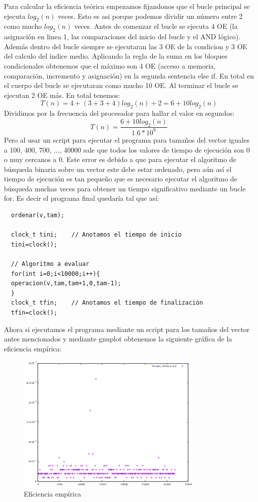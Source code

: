 \documentclass{article}
\begin{document}
Para calcular la eficiencia teórica empezamos fijandonos que el bucle principal se ejecuta $log_2(n)$ veces. Esto es asi porque podemos dividir un número entre 2 como mucho  $log_2(n)$ veces. Antes de comenzar el bucle se ejecuta 4 OE (la asignación en linea 1, las comparaciones del inicio del bucle y el AND lógico). Además dentro del bucle siempre se ejecutaran las 3 OE de la condicion y 3 OE del calculo del índice medio. Aplicando la regla de la suma en los bloques condicionales obtenemos que el máximo son 4 OE (acceso a memoria, comparación, incremento y asignación) en la segunda sentencia else if. En total en el cuerpo del bucle se ejecutaran como mucho 10 OE. Al terminar el bucle se ejecutan 2 OE más.
	En total tenemos: 
	\begin{equation}
		T(n) = 4 + (3+3+4)log_2(n) + 2 = 6+ 10log_2(n)
	\end{equation} 
	Dividimos por la frecuencia del procesador para hallar el valor en segundos:
	\begin{equation}
		T(n) = \frac{6+10log_2(n)}{1.6*10^9}
	\end{equation}
	Pero al usar un script para ejecutar el programa para tamaños del vector iguales a 100, 400, 700, ..., 40000 sale que todos los valores de tiempo de ejecución son 0 o muy cercanos a 0. Este error es debido a que para ejecutar el algoritmo de búsqueda binaria sobre un vector este debe estar ordenado, pero aún así el tiempo de ejecución es tan pequeño que es necesario ejecutar el algoritmo de búsqueda muchas veces para obtener un tiempo significativo mediante un bucle for. Es decir el programa final quedaría tal que así:
        \begin{lstlisting}
  ordenar(v,tam);

  clock_t tini;    // Anotamos el tiempo de inicio
  tini=clock();

  // Algoritmo a evaluar
  for(int i=0;i<10000;i++){
  operacion(v,tam,tam+1,0,tam-1);
  }
  clock_t tfin;    // Anotamos el tiempo de finalización
  tfin=clock();
\end{lstlisting}

	Ahora si ejecutamos el programa mediante un script para los tamaños del vector antes mencionados y mediante gnuplot obtenemos la siguiente gráfica de la eficiencia empírica:
	\begin{figure}[H]
  		\caption{Eficiencia empírica}
  		\centering
  		\includegraphics[width=0.8\textwidth]{ejer3/grafica.png}
	\end{figure}
	
\end{document}
